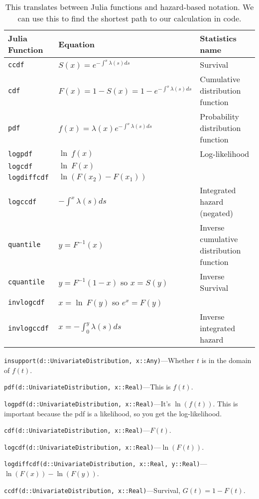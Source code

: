 \documentclass{article}
\begin{document}
\begin{table}
\begin{tabular}{lll}
	Julia Function & Equation & Statistics name \\ \hline
	\texttt{ccdf} & $S(x) = e^{-\int^x\lambda(s)ds}$ & Survival \\
	\texttt{cdf} & $F(x) = 1 - S(x) = 1-e^{-\int^x\lambda(s)ds}$ & Cumulative distribution function \\
	\texttt{pdf} & $f(x) = \lambda(x)e^{-\int^x\lambda(s)ds}$ & Probability distribution function \\
	\texttt{logpdf} & $\ln\:f(x)$ & Log-likelihood \\
	\texttt{logcdf} & $\ln\:F(x)$ & \\
	\texttt{logdiffcdf} & $\ln\left(F(x_2)-F(x_1)\right)$ & \\
	\texttt{logccdf} & $-\int^x\lambda(s)ds$ & Integrated hazard (negated) \\
	\texttt{quantile} & $y = F^{-1}(x)$ & Inverse cumulative distribution function \\
	\texttt{cquantile} & $y = F^{-1}(1-x)$ so $x = S(y)$ & Inverse Survival \\
	\texttt{invlogcdf} & $x = \ln\:F(y)$ so $e^x = F(y)$ & \\
	\texttt{invlogccdf} & $x = -\int_0^y\lambda(s)ds$ & Inverse integrated hazard
\end{tabular}
\caption{This translates between Julia functions and hazard-based notation. We can use this to find
the shortest path to our calculation in code.\label{julia-translation}}
\end{table}

\texttt{insupport(d::UnivariateDistribution, x::Any)}---Whether $t$ is in the domain of $f(t)$.

\texttt{pdf(d::UnivariateDistribution, x::Real)}---This is $f(t)$.

\texttt{logpdf(d::UnivariateDistribution, x::Real)}---It's $\ln(f(t))$. This is important because the pdf is a likelihood, so you get the log-likelihood.

\texttt{cdf(d::UnivariateDistribution, x::Real)}---$F(t)$.

\texttt{logcdf(d::UnivariateDistribution, x::Real)}---$\ln(F(t))$.

\texttt{logdiffcdf(d::UnivariateDistribution, x::Real, y::Real)}---$\ln(F(x))-\ln(F(y))$.

\texttt{ccdf(d::UnivariateDistribution, x::Real)}---Survival, $G(t) = 1-F(t)$.
\end{document}
